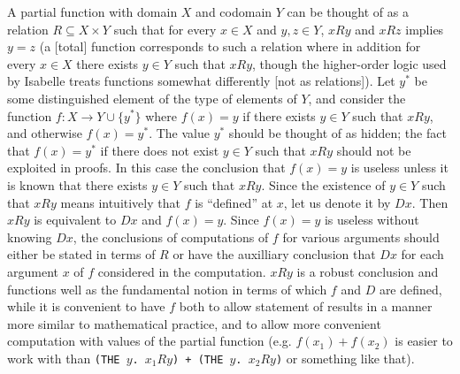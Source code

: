 \documentclass[leqno]{article}
\theoremstyle{definition}
\begin{document}
A partial function with domain $X$ and codomain $Y$ can be thought of as a relation $R \subseteq X \times Y$ such that for every $x \in X$ and $y, z \in Y$, $xRy$ and $xRz$ implies $y=z$ (a [total] function corresponds to such a relation where in addition for every $x \in X$ there exists $y \in Y$ such that $xRy$, though the higher-order logic used by Isabelle treats functions somewhat differently [not as relations]). Let $y^*$ be some distinguished element of the type of elements of $Y$, and consider the function $f\colon X \rightarrow Y \cup \{y^*\}$ where $f(x) = y$ if there exists $y \in Y$ such that $xRy$, and otherwise $f(x) = y^*$. The value $y^*$ should be thought of as hidden; the fact that $f(x) = y^*$ if there does not exist $y \in Y$ such that $xRy$ should not be exploited in proofs. In this case the conclusion that $f(x) = y$ is useless unless it is known that there exists $y \in Y$ such that $xRy$. Since the existence of $y \in Y$ such that $xRy$ means intuitively that $f$ is ``defined'' at $x$, let us denote it by $Dx$. Then $xRy$ is equivalent to $Dx$ and $f(x) = y$. Since $f(x) = y$ is useless without knowing $Dx$, the conclusions of computations of $f$ for various arguments should either be stated in terms of $R$ or have the auxilliary conclusion that $Dx$ for each argument $x$ of $f$ considered in the computation. $xRy$ is a robust conclusion and functions well as the fundamental notion in terms of which $f$ and $D$ are defined, while it is convenient to have $f$ both to allow statement of results in a manner more similar to mathematical practice, and to allow more convenient computation with values of the partial function (e.g. $f(x_1) + f(x_2)$ is easier to work with than \texttt{(THE $y$.\!\!\! $x_1Ry$) + (THE $y$.\!\!\! $x_2Ry$)} or something like that).
\end{document}
